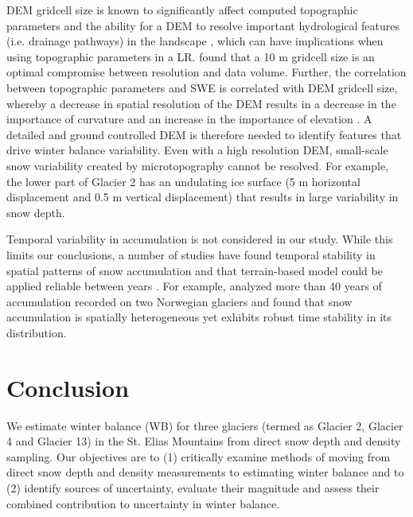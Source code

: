 \documentclass[twocolumn, letterpaper]{igs}
\begin{document}
DEM gridcell size is known to significantly affect computed topographic parameters and the ability for a DEM to resolve important hydrological features (i.e. drainage pathways) in the landscape \citep{Zhang1994, Garbrecht1994, Guo-an2001, Lopez2010}, which can have implications when using topographic parameters in a LR. \cite{Zhang1994} found that a 10 m gridcell size is an optimal compromise between resolution and data volume. Further, the correlation between topographic parameters and SWE is correlated with DEM gridcell size, whereby a decrease in spatial resolution of the DEM results in a decrease in the importance of curvature and an increase in the importance of elevation \citep[e.g.][]{Kienzle2004, Lopez2010}.  A detailed and ground controlled DEM is therefore needed to identify features that drive winter balance variability. Even with a high resolution DEM, small-scale snow variability created by microtopography cannot be resolved. For example, the lower part of Glacier 2 has an undulating ice surface (5 m horizontal displacement and 0.5 m vertical displacement) that results in large variability in snow depth.

Temporal variability in accumulation is not considered in our study. While this limits our conclusions, a number of studies have found temporal stability in spatial patterns of snow accumulation and that terrain-based model could be applied reliable between years \citep[e.g.][]{Grunewald2013}. For example, \cite{Walmsley2015} analyzed more than 40 years of accumulation recorded on two Norwegian glaciers and found that snow accumulation is spatially heterogeneous yet exhibits robust time stability in its distribution. 

\section{Conclusion}

We estimate winter balance (WB) for three glaciers (termed as Glacier 2, Glacier 4 and Glacier 13) in the St. Elias Mountains from direct snow depth and density sampling. Our objectives are to (1) critically examine methods of moving from direct snow depth and density measurements to estimating winter balance and to (2) identify sources of uncertainty, evaluate their magnitude and assess their combined contribution to uncertainty in winter balance.
\end{document}
